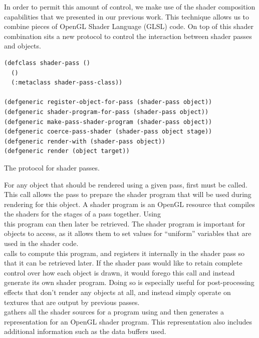 \documentclass[format=sigconf]{acmart}
\begin{document}
In order to permit this amount of control, we make use of the shader composition capabilities that we presented in our previous work\cite{glsloop}. This technique allows us to combine pieces of OpenGL Shader Language (GLSL) code. On top of this shader combination sits a new protocol to control the interaction between shader passes and objects. \\

\begin{listing}[h]
\begin{verbatim}
(defclass shader-pass ()
  ()
  (:metaclass shader-pass-class))

(defgeneric register-object-for-pass (shader-pass object))
(defgeneric shader-program-for-pass (shader-pass object))
(defgeneric make-pass-shader-program (shader-pass object))
(defgeneric coerce-pass-shader (shader-pass object stage))
(defgeneric render-with (shader-pass object))
(defgeneric render (object target))
\end{verbatim}
\caption{The protocol for shader passes.}
\label{lst:pass}
\end{listing}

For any object that should be rendered using a given pass, first  must be called. This call allows the pass to prepare the shader program that will be used during rendering for this object. A shader program is an OpenGL resource that compiles the shaders for the stages of a pass together. Using \\  this program can then later be retrieved. The shader program is important for objects to access, as it allows them to set values for ``uniform'' variables that are used in the shader code. \\

 calls  to compute this program, and registers it internally in the shader pass so that it can be retrieved later. If the shader pass would like to retain complete control over how each object is drawn, it would forego this call and instead generate its own shader program. Doing so is especially useful for post-processing effects that don't render any objects at all, and instead simply operate on textures that are output by previous passes. \\

 gathers all the shader sources for a program using  and then generates a representation for an OpenGL shader program. This representation also includes additional information such as the data buffers used. \\
\end{document}
